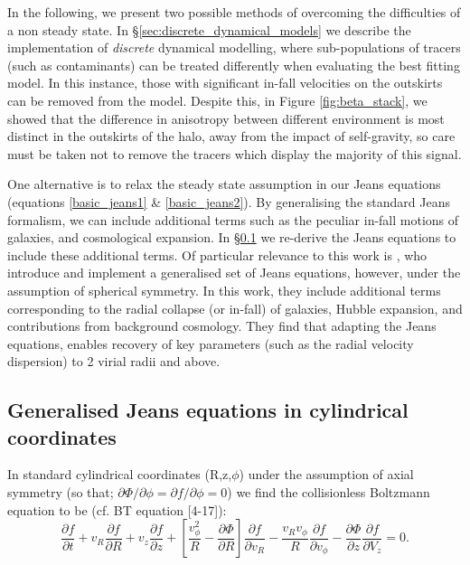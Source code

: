 In the following, we present two possible methods of overcoming the difficulties of a non steady state. In \S\ref{sec:discrete_dynamical_models} we describe the implementation of \textit{discrete} dynamical modelling, where sub-populations of tracers (such as contaminants) can be treated differently when evaluating the best fitting model. In this instance, those with significant in-fall velocities on the outskirts can be removed from the model. Despite this, in Figure \ref{fig:beta_stack}, we showed that the difference in anisotropy between different environment is most distinct in the outskirts of the halo, away from the impact of self-gravity, so care must be taken not to remove the tracers which display the majority of this signal.

One alternative is to relax the steady state assumption in our Jeans equations (equations \ref{basic_jeans1} \& \ref{basic_jeans2}). By generalising the standard Jeans formalism, we can include additional terms such as the peculiar in-fall motions of galaxies, and cosmological expansion. In \S\ref{sec:jeans_rederivation} we re-derive the Jeans equations to include these additional terms. Of particular relevance to this work is \citet{falco2013}, who introduce and implement a generalised set of Jeans equations, however, under the assumption of spherical symmetry. In this work, they include additional terms corresponding to the radial collapse (or in-fall) of galaxies, Hubble expansion, and contributions from background cosmology. They find that adapting the Jeans equations, enables recovery of key parameters (such as the radial velocity dispersion) to 2 virial radii and above. 

\subsection{Generalised Jeans equations in cylindrical coordinates} \label{sec:jeans_rederivation}
In standard cylindrical coordinates (R,z,$\phi$) under the assumption of axial symmetry (so that; $\partial \Phi / \partial \phi = \partial f / \partial \phi = 0$) we find the collisionless Boltzmann equation to be (cf. BT equation [4-17]): 
\begin{equation} \label{eq:CBE}
\frac{\partial f}{\partial t} + v_R \frac{\partial f}{\partial R} + v_z \frac{\partial f}{\partial z} + \left[\frac{v_{\phi}^2}{R} - \frac{\partial \Phi}{\partial R}\right] \frac{\partial f}{\partial v_R} - \frac{v_R v_{\phi}}{R} \frac{\partial f}{\partial v_{\phi}} - \frac{\partial \Phi}{\partial z} \frac{\partial f}{\partial V_z} = 0.
\end{equation}

